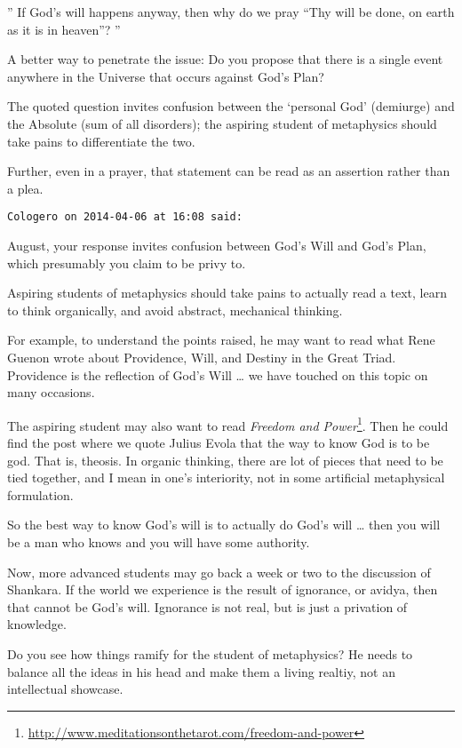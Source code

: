 \begin{footnotesize}
\begin{sffamily}
” If God's will happens anyway, then why do we pray “Thy will be done, on earth as it is in heaven”? ”

A better way to penetrate the issue: Do you propose that there is a single event anywhere in the Universe that occurs against God's Plan?

The quoted question invites confusion between the `personal God’ (demiurge) and the Absolute (sum of all disorders); the aspiring student of metaphysics should take pains to differentiate the two.

Further, even in a prayer, that statement can be read as an assertion rather than a plea.


\hfill

\texttt{Cologero on 2014-04-06 at 16:08 said: }

August, your response invites confusion between God's Will and God's Plan, which presumably you claim to be privy to.

Aspiring students of metaphysics should take pains to actually read a text, learn to think organically, and avoid abstract, mechanical thinking.

For example, to understand the points raised, he may want to read what Rene Guenon wrote about Providence, Will, and Destiny in the Great Triad. Providence is the reflection of God's Will … we have touched on this topic on many occasions.

The aspiring student may also want to read \textit{Freedom and Power}\footnote{\url{http://www.meditationsonthetarot.com/freedom-and-power}}. Then he could find the post where we quote Julius Evola that the way to know God is to be god. That is, theosis. In organic thinking, there are lot of pieces that need to be tied together, and I mean in one's interiority, not in some artificial metaphysical formulation.

So the best way to know God's will is to actually do God's will … then you will be a man who knows and you will have some authority.

Now, more advanced students may go back a week or two to the discussion of Shankara. If the world we experience is the result of ignorance, or avidya, then that cannot be God's will. Ignorance is not real, but is just a privation of knowledge.

Do you see how things ramify for the student of metaphysics? He needs to balance all the ideas in his head and make them a living realtiy, not an intellectual showcase.


\hfill


\end{sffamily}
\end{footnotesize}
